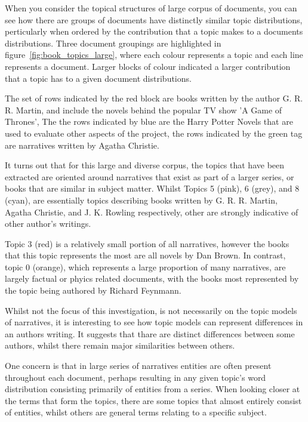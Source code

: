 \documentclass[10pt]{report}
\begin{document}
\begin{multicols}{2}
  \columnbreak
  
  When you consider the topical structures of large corpus of documents, you can see how there are  groups of documents have distinctly similar topic distributions, perticularly when ordered by the contribution that a topic makes to a documents distributions. Three document groupings are highlighted in figure~\ref{fig:book_topics_large}, where each colour represents a topic and each line represents a document. Larger blocks of colour indicated a larger contribution that a topic has to a given document distributions.

  The set of rows indicated by the red block are books written by the author G. R. R. Martin, and include the novels behind the popular TV show 'A Game of Thrones', The the rows indicated by blue are the Harry Potter Novels that are used to evaluate other aspects of the project, the rows indicated by the green tag are narratives written by Agatha Christie.

It turns out that for this large and diverse corpus, the topics that have been extracted are oriented around narratives that exist as part of a larger series, or books that are similar in subject matter. Whilst Topics 5 (pink), 6 (grey), and 8 (cyan), are essentially topics describing books written by G. R. R. Martin, Agatha Christie, and J. K. Rowling respectively, other are strongly indicative of other author's writings.
\end{multicols}

Topic 3 (red) is a relatively small portion of all narratives, however the books that this topic represents the most are all novels by Dan Brown. In contrast, topic 0 (orange), which represents a large proportion of many narratives, are largely factual or phyics related documents, with the books most represented by the topic being authored by Richard Feynmann.

Whilst not the focus of this investigation, is not necessarily on the topic models of narratives, it is interesting to see how topic models can represent differences in an authors writing. It suggests that thare are distinct differences between some authors, whilst there remain major similarities between others.

One concern is that in large series of narratives entities are often present throughout each document, perhaps resulting in any given topic's word distribution consisting primarily of entities from a series. When looking closer at the terms that form the topics, there are some topics that almost entirely consist of entities, whilst others are general terms relating to a specific subject.
\end{document}
